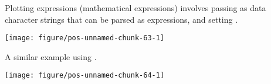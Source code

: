 \documentclass[paper=a4,headsepline,BCOR=12mm,twoside,open=right,%
titlepage,headings=small,fontsize=10pt,index=totoc,bibliography=totoc,%
captions=tableheading,captions=nooneline]{scrbook}\usepackage{knitr}
\begin{document}
Plotting expressions (mathematical expressions) involves passing as  data character strings that can be parsed as expressions, and setting .

\begin{knitrout}\footnotesize
{}\color{fgcolor}\begin{kframe}
\begin{alltt}
 \hlkwb{<-}
  \hlstd{(}\hlstd{=}\hlopt{:}\hlstd{,} \hlstd{=}\hlstd{(}\hlstd{,} \hlstd{),}
             \hlstd{=}\hlstd{(}\hlstr{"alpha["}\hlstd{,} \hlopt{:}\hlstd{,} \hlstr{"]"}\hlstd{,}  \hlstd{=} \hlstd{))}

  \hlopt{+}
  \hlstd{(}\hlstd{=}\hlopt{-}\hlstd{,} \hlstd{=}\hlstd{,}  \hlstd{=} \hlstd{(}\hlstd{))} \hlopt{+}
  \hlstd{()}
\end{alltt}
\end{kframe}

{\centering \texttt{[image: figure/pos-unnamed-chunk-63-1]} 

}



\end{knitrout}

A similar example using .

\begin{knitrout}\footnotesize
{}\color{fgcolor}\begin{kframe}
\begin{alltt}
    \hlopt{+}
  \hlstd{(} \hlstd{=} \hlopt{-}\hlstd{,}  \hlstd{=} \hlstd{,}  \hlstd{=} \hlstd{(}\hlstd{),}
              \hlstd{=} \hlstd{,}  \hlstd{=} \hlstd{)} \hlopt{+}
  \hlstd{()}
\end{alltt}
\end{kframe}

{\centering \texttt{[image: figure/pos-unnamed-chunk-64-1]} 

}



\end{knitrout}
\end{document}
